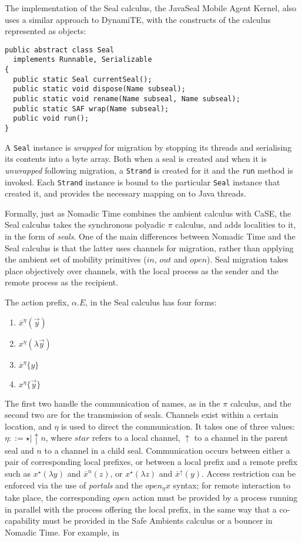 The implementation of the Seal calculus, the JavaSeal Mobile Agent
Kernel, also uses a similar approach to DynamiTE, with the constructs
of the calculus represented as objects:

\begin{verbatim}
public abstract class Seal
  implements Runnable, Serializable
{
  public static Seal currentSeal();
  public static void dispose(Name subseal);
  public static void rename(Name subseal, Name subseal);
  public static SAF wrap(Name subseal);
  public void run();
}
\end{verbatim}

A \texttt{Seal} instance is \emph{wrapped} for migration by stopping
its threads and serialising its contents into a byte array.  Both when
a seal is created and when it is \emph{unwrapped} following migration,
a \texttt{Strand} is created for it and the \texttt{run} method is
invoked.  Each \texttt{Strand} instance is bound to the particular
\texttt{Seal} instance that created it, and provides the necessary
mapping on to Java threads.

Formally, just as Nomadic Time combines the ambient calculus with
CaSE, the Seal calculus takes the synchronous polyadic $\pi$ calculus,
and adds localities to it, in the form of \emph{seals}.  One of the
main differences between Nomadic Time and the Seal calculus is that
the latter uses channels for migration, rather than applying the
ambient set of mobility primitives ($in$, $out$ and $open$).  Seal
migration takes place objectively over channels, with the local
process as the sender and the remote process as the recipient.  

The action prefix, $\alpha.E$, in the Seal calculus has four forms:

\begin{enumerate}
\item $\overline{x}^\eta(\vec{y})$
\item $x^\eta(\lambda \vec{y})$
\item $\overline{x}^\eta\{y\}$
\item $x^\eta\{\vec{y}\}$
\end{enumerate}

The first two handle the communication of names, as in the $\pi$
calculus, and the second two are for the transmission of seals.
Channels exist within a certain location, and $\eta$ is used to direct
the communication.  It takes one of three values: $\eta ::= \star |
\uparrow n$, where $star$ refers to a local channel, $\uparrow$ to a
channel in the parent seal and $n$ to a channel in a child seal.
Communication occurs between either a pair of corresponding local
prefixes, or between a local prefix and a remote prefix such as
$x^\star(\lambda y)$ and $\overline x^n(z)$, or $x^\star(\lambda z)$
and $\overline{x}^\uparrow(y)$.  Access restriction can be enforced
via the use of \emph{portals} and the $open_\eta x$ syntax; for remote
interaction to take place, the corresponding $open$ action must be
provided by a process running in parallel with the process offering
the local prefix, in the same way that a co-capability must be
provided in the Safe Ambients calculus or a bouncer in Nomadic Time.
For example, in

